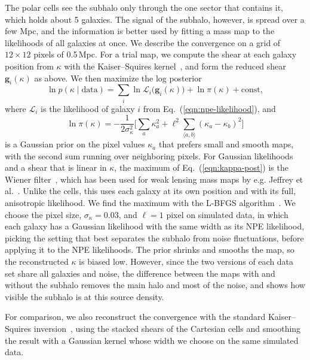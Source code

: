 The polar cells see the subhalo only through the one sector that contains it, which holds about 5 galaxies. The signal of the subhalo, however, is spread over a few Mpc, and the information is better used by fitting a mass map to the likelihoods of all galaxies at once. We describe the convergence on a grid of $12\times12$ pixels of 0.5\,Mpc. For a trial map, we compute the shear at each galaxy position from $\kappa$ with the Kaiser--Squires kernel~\citep{KS93}, and form the reduced shear $\mathbf{g}_i(\kappa)$ as above. We then maximize the log posterior
\begin{equation}
\label{eqn:kappa-post}
    \ln p(\kappa \mid \text{data}) = \sum_i \ln \mathcal{L}_i\big(\mathbf{g}_i(\kappa)\big) + \ln \pi(\kappa) + \mathrm{const},
\end{equation}
where $\mathcal{L}_i$ is the likelihood of galaxy $i$ from Eq.~(\ref{eqn:npe-likelihood}), and
\begin{equation}
\label{eqn:kappa-prior}
    \ln \pi(\kappa) = - \frac{1}{2\sigma_\kappa^2}\Big[\sum_a \kappa_a^2 + \ell^2 \sum_{\langle a,b \rangle} (\kappa_a - \kappa_b)^2\Big]
\end{equation}
is a Gaussian prior on the pixel values $\kappa_a$ that prefers small and smooth maps, with the second sum running over neighboring pixels. For Gaussian likelihoods and a shear that is linear in $\kappa$, the maximum of Eq.~(\ref{eqn:kappa-post}) is the Wiener filter~\citep{Zaroubi95}, which has been used for weak lensing mass maps by e.g. Jeffrey et al.~\citep{Jeffrey18}. Unlike the cells, this uses each galaxy at its own position and with its full, anisotropic likelihood. We find the maximum with the L-BFGS algorithm~\citep{LBFGS}. We choose the pixel size, $\sigma_\kappa = 0.03$, and $\ell = 1$ pixel on simulated data, in which each galaxy has a Gaussian likelihood with the same width as its NPE likelihood, picking the setting that best separates the subhalo from noise fluctuations, before applying it to the NPE likelihoods. The prior shrinks and smooths the map, so the reconstructed $\kappa$ is biased low. However, since the two versions of each data set share all galaxies and noise, the difference between the maps with and without the subhalo removes the main halo and most of the noise, and shows how visible the subhalo is at this source density.

For comparison, we also reconstruct the convergence with the standard Kaiser--Squires inversion~\citep{KS93}, using the stacked shears of the Cartesian cells and smoothing the result with a Gaussian kernel whose width we choose on the same simulated data.

